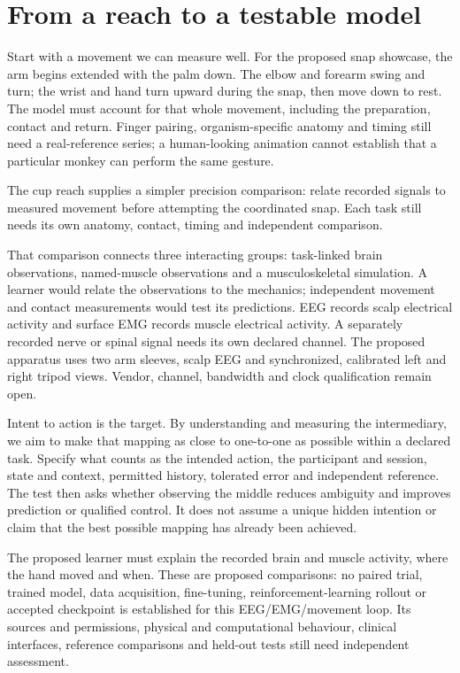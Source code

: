 \section{From a reach to a testable model}
Start with a movement we can measure well. For the proposed snap showcase,
the arm begins extended with the palm down. The elbow and forearm swing and
turn; the wrist and hand turn upward during the snap, then move down to rest.
The model must account for that whole movement, including the preparation,
contact and return. Finger pairing, organism-specific anatomy and timing still
need a real-reference series; a human-looking animation cannot establish that
a particular monkey can perform the same gesture.

The cup reach supplies a simpler precision comparison: relate recorded signals
to measured movement before attempting the coordinated snap. Each task still
needs its own anatomy, contact, timing and independent comparison.

That comparison connects three interacting groups: task-linked brain
observations, named-muscle observations and a musculoskeletal simulation.
A learner would relate the observations to the mechanics; independent movement
and contact measurements would test its predictions. EEG records scalp
electrical activity and surface EMG records muscle electrical activity.
A separately recorded nerve or spinal signal needs its own declared channel.
The proposed apparatus uses two arm sleeves, scalp EEG and synchronized,
calibrated left and right tripod views. Vendor, channel, bandwidth and clock
qualification remain open.

Intent to action is the target. By understanding and measuring the intermediary,
we aim to make that mapping as close to one-to-one as possible within a declared
task. Specify what counts as the intended action, the participant and session,
state and context, permitted history, tolerated error and independent reference.
The test then asks whether observing the middle reduces ambiguity and improves
prediction or qualified control. It does not assume a unique hidden intention
or claim that the best possible mapping has already been achieved.

The proposed learner must explain the recorded brain and muscle activity,
where the hand moved and when. These are proposed comparisons: no paired trial,
trained model, data acquisition, fine-tuning, reinforcement-learning rollout or
accepted checkpoint is established for this EEG/EMG/movement loop. Its sources
and permissions, physical and computational behaviour, clinical interfaces,
reference comparisons and held-out tests still need independent assessment.


